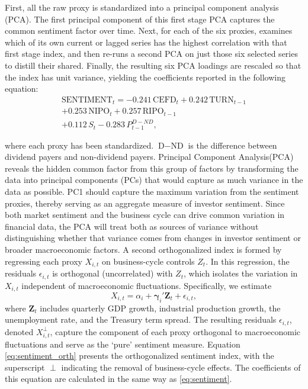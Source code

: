 First, all the raw proxy is standardized into a principal component analysis (PCA). The first principal component of this first stage PCA captures the common sentiment factor over time. Next, for each of the six proxies,  examines which of its own current or lagged series has the highest correlation with that first stage index, and then re-runs a second PCA on just those six selected series to distill their shared. Finally, the resulting six PCA loadings are rescaled so that the index has unit variance, yielding the coefficients reported in the following equation:
\begin{equation}
    \label{eq:sentiment}
    \begin{split}
    \text{SENTIMENT}_t = -0.241\,\text{CEFD}_t + 0.242\,\text{TURN}_{t-1} \\ + 0.253\,\text{NIPO}_t 
    + 0.257\,\text{RIPO}_{t-1} \\ + 0.112\,S_t - 0.283\,P^{D-ND}_{t-1} , 
    \end{split}
\end{equation}

where each proxy has been standardized. $\text{D}-\text{ND}$ is the difference between dividend payers and non-dividend payers. Principal Component Analysis(PCA) reveals the hidden common factor from this group of factors by transforming the data into principal components (PCs) that would capture as much variance in the data as possible. PC1 should capture the maximum variation from the sentiment proxies, thereby serving as an aggregate measure of investor sentiment. Since both market sentiment and the business cycle can drive common variation in financial data, the PCA will treat both as sources of variance without distinguishing whether that variance comes from changes in investor sentiment or broader macroeconomic factors. A second orthogonalized index is formed by regressing each proxy \(X_{i,t}\) on business-cycle controls \(Z_t\). In this regression, the residuals \(\epsilon_{i,t}\) is orthogonal (uncorrelated) with \(Z_t\), which isolates the variation in \(X_{i,t}\) independent of macroeconomic fluctuations.
Specifically, we estimate
\begin{equation}
X_{i,t} = \alpha_i + \boldsymbol{\gamma}_i'\mathbf{Z}_t + \epsilon_{i,t},
\end{equation}
where \(\mathbf{Z}_t\) includes quarterly GDP growth, industrial production growth, the unemployment rate, and the Treasury term spread. The resulting residuals \(\epsilon_{i,t}\), denoted \(X_{i,t}^\perp\), capture the component of each proxy orthogonal to macroeconomic fluctuations and serve as the ‘pure’ sentiment measure. Equation \ref{eq:sentiment_orth} presents the orthogonalized sentiment index, with the superscript \(\perp\) indicating the removal of business-cycle effects. The coefficients of this equation are calculated in the same way as \cref{eq:sentiment}.

